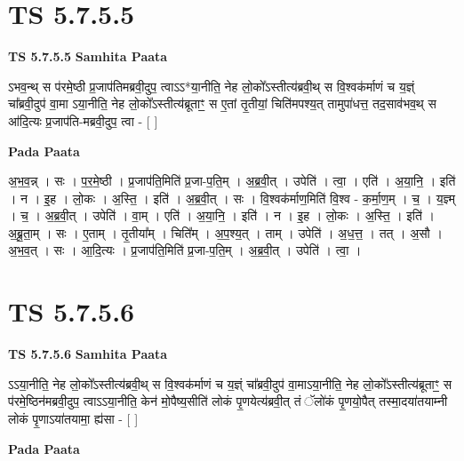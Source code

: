\documentclass[17pt]{extarticle}
\begin{document}
\section*{ TS 5.7.5.5 }

\textbf{TS 5.7.5.5 } \newline
\textbf{Samhita Paata} \newline

ऽभव॒न्थ् स प॑रमे॒ष्ठी प्र॒जाप॑तिमब्रवी॒दुप॒ त्वाऽऽ*या॒नीति॒ नेह लो॒को᳚ऽस्तीत्य॑ब्रवी॒थ् स वि॒श्वक॑र्माणं च य॒ज्ञ्ं चा᳚ब्रवी॒दुप॑ वा॒मा ऽया॒नीति॒ नेह लो॒को᳚ऽस्तीत्य॑ब्रूताꣳ॒॒ स ए॒तां तृ॒तीयां॒ चिति॑मपश्य॒त् तामुपा॑धत्त॒ तद॒साव॑भव॒थ् स आ॑दि॒त्यः प्र॒जाप॑ति-मब्रवी॒दुप॒ त्वा - [  ] \newline

\textbf{Pada Paata} \newline

अ॒भ॒व॒न्न् । सः । प॒र॒मे॒ष्ठी । प्र॒जाप॑ति॒मिति॑ प्र॒जा-प॒ति॒म् । अ॒ब्र॒वी॒त् । उपेति॑ । त्वा॒ । एति॑ । अ॒या॒नि॒ । इति॑ । न । इ॒ह । लो॒कः । अ॒स्ति॒ । इति॑ । अ॒ब्र॒वी॒त् । सः । वि॒श्वक॑र्माण॒मिति॑ वि॒श्व - क॒र्मा॒ण॒म् । च॒ । य॒ज्ञ्म् । च॒ । अ॒ब्र॒वी॒त् । उपेति॑ । वा॒म् । एति॑ । अ॒या॒नि॒ । इति॑ । न । इ॒ह । लो॒कः । अ॒स्ति॒ । इति॑ । अ॒ब्रू॒ता॒म् । सः । ए॒ताम् । तृ॒तीया᳚म् । चिति᳚म् । अ॒प॒श्य॒त् । ताम् । उपेति॑ । अ॒ध॒त्त॒ । तत् । अ॒सौ । अ॒भ॒व॒त् । सः । आ॒दि॒त्यः । प्र॒जाप॑ति॒मिति॑ प्र॒जा-प॒ति॒म् । अ॒ब्र॒वी॒त् । उपेति॑ । त्वा॒ ।  \newline




\section*{ TS 5.7.5.6 }

\textbf{TS 5.7.5.6 } \newline
\textbf{Samhita Paata} \newline

ऽऽया॒नीति॒ नेह लो॒को᳚ऽस्तीत्य॑ब्रवी॒थ् स वि॒श्वक॑र्माणं च य॒ज्ञ्ं चा᳚ब्रवी॒दुप॑ वा॒माऽया॒नीति॒ नेह लो॒को᳚ऽस्तीत्य॑ब्रूताꣳ॒॒ स प॑रमे॒ष्ठिन॑मब्रवी॒दुप॒ त्वाऽऽया॒नीति॒ केन॑ मो॒पैष्य॒सीति॑ लोकं पृ॒णयेत्य॑ब्रवी॒त् तं ॅलो॑कं पृ॒णयो॒पैत् तस्मा॒दया॑तयाम्नी लोकं पृ॒णाऽया॑तयामा॒ ह्य॑सा - [  ] \newline

\textbf{Pada Paata} \newline
\end{document}

